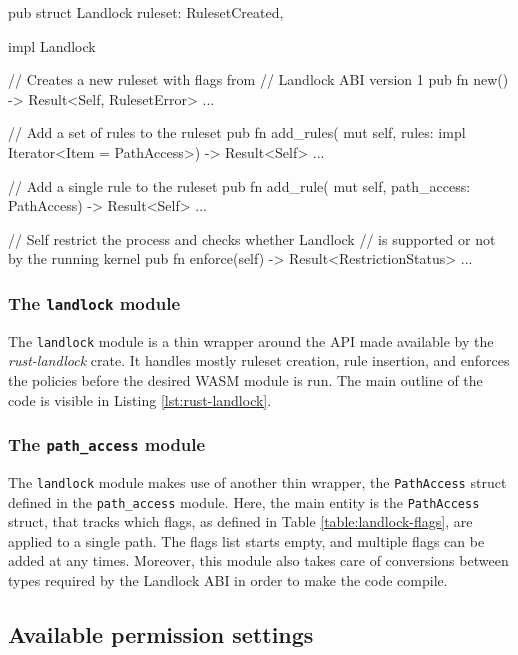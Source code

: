 \begin{code}[language=Rust, caption=The outline of the \texttt{landlock} module., label=lst:rust-landlock]
pub struct Landlock {
  ruleset: RulesetCreated,
}

impl Landlock {
  // Creates a new ruleset with flags from
  // Landlock ABI version 1
  pub fn new() -> Result<Self, RulesetError> {...}

  // Add a set of rules to the ruleset
  pub fn add_rules(
    mut self,
    rules: impl Iterator<Item = PathAccess>)
    -> Result<Self>
  {...}

  // Add a single rule to the ruleset
  pub fn add_rule(
    mut self,
    path_access: PathAccess) -> Result<Self>
  {...}

  // Self restrict the process and checks whether Landlock
  // is supported or not by the running kernel
  pub fn enforce(self) -> Result<RestrictionStatus>
  {...}
}
\end{code}

\subsubsection{The \texttt{landlock} module}

The \texttt{landlock} module is a thin wrapper around the API made available by the \textit{rust-landlock} crate.
It handles mostly ruleset creation, rule insertion, and enforces the policies before the desired WASM module is run.
The main outline of the code is visible in Listing \ref{lst:rust-landlock}.

\subsubsection{The \texttt{path\_access} module}

The \texttt{landlock} module makes use of another thin wrapper, the \texttt{PathAccess} struct defined
in the \texttt{path\_access} module.
Here, the main entity is the \texttt{PathAccess} struct, that tracks which flags, as defined in Table \ref{table:landlock-flags},
are applied to a single path. The flags list starts empty, and multiple flags can be added at any times.
Moreover, this module also takes care of conversions between types required by the Landlock ABI in order
to make the code compile.

\subsection{Available permission settings}


